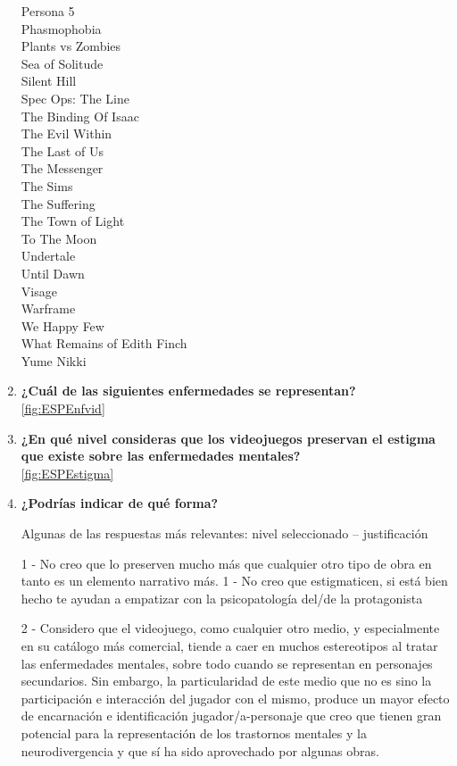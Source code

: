 \documentclass[12pt, a4paper,twoside,titlepage]{book}
\begin{document}
\begin{enumerate}[label=\textbf{\arabic*}.]
        Persona 5\\
        Phasmophobia\\
        Plants vs Zombies\\
        Sea of Solitude\\
        Silent Hill\\
        Spec Ops: The Line\\
        The Binding Of Isaac\\
        The Evil Within\\
        The Last of Us\\
        The Messenger\\
        The Sims\\
        The Suffering\\
        The Town of Light\\
        To The Moon\\
        Undertale\\
        Until Dawn\\
        Visage\\
        Warframe \\
        We Happy Few\\
        What Remains of Edith Finch\\
        Yume Nikki\\


     \item \textbf{¿Cuál de las siguientes enfermedades se representan? }\\
     \ref{fig:ESPEnfvid}
     \item \textbf{¿En qué nivel consideras que los videojuegos preservan el estigma que existe sobre las enfermedades mentales?}\\
     \ref{fig:ESPEstigma}
     \item \textbf{¿Podrías indicar de qué forma?}
    \label{estigmaCastellano}
    
    Algunas de las respuestas más relevantes: nivel seleccionado – justificación
        
    1 - No creo que lo preserven mucho más que cualquier otro tipo de obra en tanto es un elemento narrativo más.
    1 - No creo que estigmaticen, si está bien hecho te ayudan a empatizar con la psicopatología del/de la protagonista
    
    2 - Considero que el videojuego, como cualquier otro medio, y especialmente en su catálogo más comercial, tiende a caer en muchos estereotipos al tratar las enfermedades mentales, sobre todo cuando se representan en personajes secundarios. Sin embargo, la particularidad de este medio que no es sino la participación e interacción del jugador con el mismo, produce un mayor efecto de encarnación e identificación jugador/a-personaje que creo que tienen gran potencial para la representación de los trastornos mentales y la neurodivergencia y que sí ha sido aprovechado por algunas obras.
    

\end{enumerate}
\end{document}
